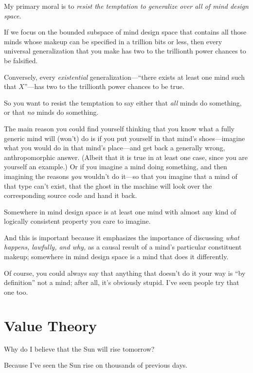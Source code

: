 {
 My primary moral is to \textit{resist the temptation to generalize
over all of mind design space}.}


 If we focus on the bounded subspace of mind design space that
contains all those minds whose makeup can be specified in a trillion
bits or less, then every universal generalization that you make has two
to the trillionth power chances to be falsified.


 Conversely, every \textit{existential}
generalization---``there exists at least one mind such
that $X$''---has two to the trillionth power chances to
be true.


 So you want to resist the temptation to say either that
\textit{all} minds do something, or that \textit{no} minds do
something.


 The main reason you could find yourself thinking that you know
what a fully generic mind will (won't) do is if you put
yourself in that mind's shoes---imagine what you would
do in that mind's place---and get back a generally
wrong, anthropomorphic answer. (Albeit that it is true in at least one
case, since you are yourself an example.) Or if you imagine a mind
doing something, and then imagining the reasons \textit{you}
wouldn't do it---so that you imagine that a mind of
that type can't exist, that the ghost in the machine
will look over the corresponding source code and hand it back.


 Somewhere in mind design space is at least one mind with almost
any kind of logically consistent property you care to imagine.


 And this is important because it emphasizes the importance of
discussing \textit{what happens, lawfully, and why,} as a causal result
of a mind's particular constituent makeup; somewhere in
mind design space is a mind that does it differently.


 Of course, you could always say that anything that
doesn't do it your way is ``by
definition'' not a mind; after all,
it's obviously stupid. I've seen people
try that one too.

\myendsectiontext

\chapter{Value Theory}



 Why do I believe that the Sun will rise tomorrow? 


 Because I've seen the Sun rise on thousands of
previous days.


